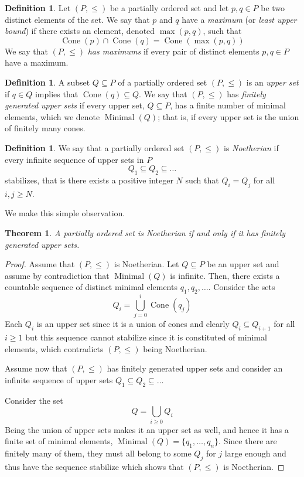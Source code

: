 \documentclass{memo-l}
\theoremstyle{plain}
\theoremstyle{definition}
\numberwithin{section}{chapter}
\numberwithin{equation}{chapter}
\DeclareMathOperator{\Cone}{Cone}
\DeclareMathOperator{\Minimal}{Minimal}
\theoremstyle{plain}
\newtheorem{thm}[theorem]{Theorem}
\theoremstyle{definition}
\newtheorem{defn}[theorem]{Definition}
\begin{document}
\begin{defn} Let \( (P,\leq) \) be a partially ordered set and let \(p,q
\in P\) be two distinct elements of the set. We say that \(p\) and \(q\)
have a \emph{maximum} (or \emph{least upper bound}) if there exists an
element, denoted \( \max(p,q) \), such that \[ \Cone(p) \cap \Cone(q) =
\Cone(\max(p,q)) \] We say that \( (P,\leq) \) \emph{has maximums} if every
pair of distinct elements \(p,q \in P\) have a maximum.  \end{defn}

\begin{defn} A subset \( Q \subseteq P \) of a partially ordered set \(
(P,\leq) \) is an \emph{upper set} if \( q \in Q \) implies that \(
\Cone(q) \subseteq Q \). We say that \( (P,\leq) \) has \emph{finitely
generated upper sets} if every upper set, \( Q \subseteq P \), has a finite
number of minimal elements, which we denote \( \Minimal(Q) \); that is, if
every upper set is the union of finitely many cones.  \end{defn}

\begin{defn} We say that a partially ordered set \( (P,\leq) \) is
\emph{Noetherian} if every infinite sequence of upper sets in \(P\) \[ Q_1
\subseteq Q_2 \subseteq \ldots \] stabilizes, that is there exists a
positive integer \(N\) such that \( Q_i = Q_j \) for all \(i,j \geq N\).
\end{defn}

We make this simple observation.

\begin{thm} A partially ordered set is Noetherian if and only if it has
finitely generated upper sets.  \end{thm} \begin{proof} Assume that \(
(P,\leq) \) is Noetherian. Let \( Q \subseteq P \) be an upper set and
assume by contradiction that \( \Minimal(Q) \) is infinite. Then, there
exists a countable sequence of distinct minimal elements \(q_1, q_2, \ldots
\). Consider the sets \[ Q_i = \bigcup_{j=0}^i \Cone(q_j) \] Each \( Q_i \)
is an upper set since it is a union of cones and clearly \( Q_i \subseteq
Q_{i+1} \) for all \(i \geq 1\) but this sequence cannot stabilize since it
is constituted of minimal elements, which contradicts \( (P,\leq) \) being
Noetherian.

Assume now that \( (P,\leq) \) has finitely generated upper sets and
consider an infinite sequence of upper sets \( Q_1 \subseteq Q_2 \subseteq
\ldots \)

Consider the set \[ Q = \bigcup_{i \geq 0} Q_i \] Being the union of upper
sets makes it an upper set as well, and hence it has a finite set of
minimal elements, \( \Minimal(Q) = \{q_1, \ldots, q_n\} \). Since there are
finitely many of them, they must all belong to some \( Q_j \) for \( j \)
large enough and thus have the sequence stabilize which shows that \(
(P,\leq) \) is Noetherian.  \end{proof}
\end{document}

